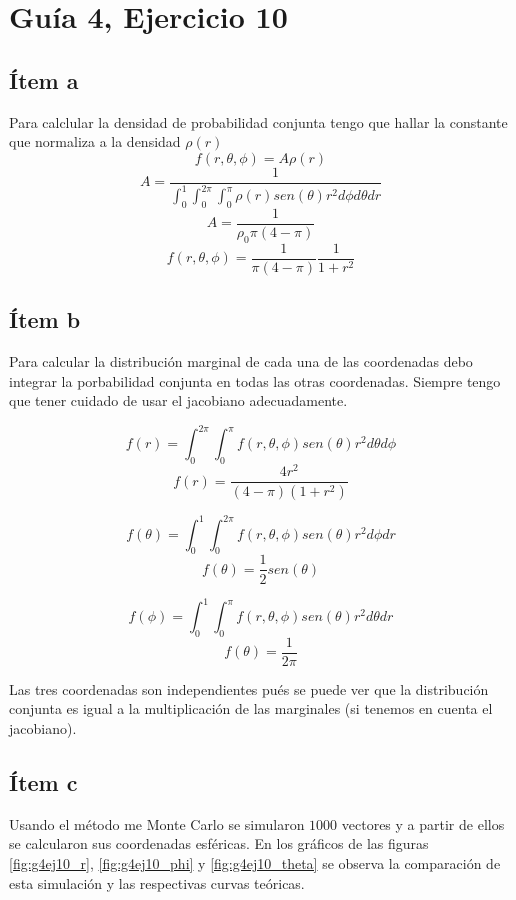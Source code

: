 \documentclass{article}
\begin{document}
\section{Guía 4, Ejercicio 10}

\subsection{Ítem a}
Para calclular la densidad de probabilidad conjunta tengo que hallar la constante que normaliza a la densidad $\rho(r)$
$$f(r, \theta, \phi) = A \rho(r) $$
$$A = \frac{1}{\int_0^1 \int_0^{2\pi} \int_0^{\pi}\rho(r) sen(\theta) r^2 d\phi d\theta dr} $$
$$A = \frac{1}{\rho_0 \pi (4 - \pi)} $$
$$f(r, \theta, \phi) = \frac{1}{\pi (4 - \pi)} \frac{1}{1 + r^2} $$

\subsection{Ítem b}
Para calcular la distribución marginal de cada una de las coordenadas debo integrar la porbabilidad conjunta en todas las otras coordenadas. Siempre tengo que tener cuidado de usar el jacobiano adecuadamente.

$$f(r) = \int_0^{2\pi}\int_0^{\pi} f(r, \theta, \phi) sen(\theta) r^2 d\theta d\phi$$
$$f(r) = \frac{4 r^2}{(4 - \pi) (1 + r^2)}$$

$$f(\theta) = \int_0^1 \int_0^{2\pi}  f(r, \theta, \phi) sen(\theta) r^2 d\phi dr$$
$$f(\theta) = \frac{1}{2} sen(\theta)$$

$$f(\phi) = \int_0^1 \int_0^{\pi}  f(r, \theta, \phi) sen(\theta) r^2 d\theta dr$$
$$f(\theta) = \frac{1}{2\pi}$$

Las tres coordenadas son independientes pués se puede ver que la distribución conjunta es igual a la multiplicación de las marginales (si tenemos en cuenta el jacobiano).

\subsection{Ítem c}

Usando el método me Monte Carlo se simularon $1000$ vectores y a partir de ellos se calcularon sus coordenadas esféricas.
En los gráficos de las figuras \ref{fig:g4ej10_r}, \ref{fig:g4ej10_phi} y \ref{fig:g4ej10_theta} se observa la comparación de esta simulación y las respectivas curvas teóricas. 
\end{document}
